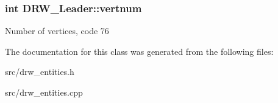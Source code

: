 \subsubsection[{vertnum}]{\setlength{\rightskip}{0pt plus 5cm}int D\+R\+W\+\_\+\+Leader\+::vertnum}\label{class_d_r_w___leader_a8c0f8d7ebce1a2f1a4cb6d367a0c6a0d}
Number of vertices, code 76 

The documentation for this class was generated from the following files\+:\begin{DoxyCompactItemize}
\item 
src/drw\+\_\+entities.\+h\item 
src/drw\+\_\+entities.\+cpp\end{DoxyCompactItemize}
